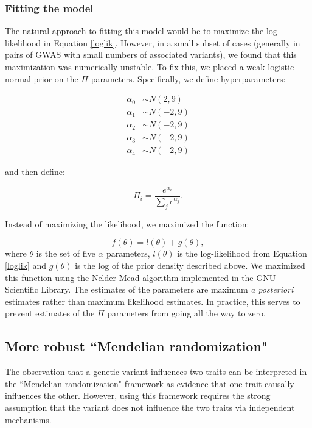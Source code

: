 \documentclass[11pt,titlepage]{article}
\begin{document}
\subsubsection{Fitting the model}\label{map}
The natural approach to fitting this model would be to maximize the log-likelihood in Equation \ref{loglik}. However, in a small subset of cases (generally in pairs of GWAS with small numbers of associated variants), we found that this maximization was numerically unstable. To fix this, we placed a weak logistic normal prior on the $\Pi$ parameters. Specifically, we define hyperparameters:

\begin{align}
\alpha_0 &\sim N(2, 9) \\
\alpha_1 &\sim N(-2, 9)\\
\alpha_2 &\sim N(-2, 9)\\
\alpha_3 &\sim N(-2, 9)\\
\alpha_4 &\sim N(-2, 9)
\end{align}

\noindent and then define:

\begin{equation} 
\Pi_i = \frac{e^{\alpha_i}}{\sum_j e^{\alpha_j}}.
\end{equation}

Instead of maximizing the likelihood, we maximized the function:

\begin{equation}
f(\theta) = l(\theta) + g(\theta),
\end{equation}
where $\theta$ is the set of five $\alpha$ parameters, $l(\theta)$ is the log-likelihood from Equation \ref{loglik} and $g(\theta)$ is the log of the prior density described above. We maximized this function using the Nelder-Mead algorithm implemented in the GNU Scientific Library. The estimates of the parameters are maximum \emph{a posteriori} estimates rather than maximum likelihood estimates. In practice, this serves to prevent estimates of the $\Pi$ parameters from going all the way to zero. 


\subsection{More robust ``Mendelian randomization"}
The observation that a genetic variant influences two traits can be interpreted in the ``Mendelian randomization" framework as evidence that one trait causally influences the other. However, using this framework requires the strong assumption that the variant does not influence the two traits via independent mechanisms. 
\end{document}
